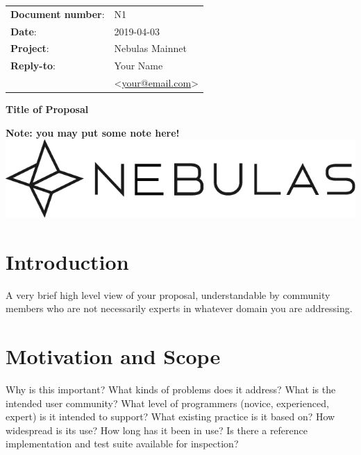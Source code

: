 \documentclass[11pt]{article}
\begin{document}
\begin{titlepage}
    \begin{center}
        \vspace*{1cm}

\begin{flushright}
  \begin{tabular}{ll}
  \textbf{Document number}:& N1 \\
  \textbf{Date}:       & 2019-04-03 \\
  \textbf{Project}:    & Nebulas Mainnet \\
  \textbf{Reply-to}:   & {Your Name}\\
              &
              \textless\href{mailto:your@email.com}{your@email.com}\textgreater
  \end{tabular}
\end{flushright}

\vspace{2cm}
        \Huge
        \textbf{Title of Proposal}

        \vspace{0.5cm}

        \vfill
        \small \textbf{Note: you may put some note here!} \\
        \vspace{0.5cm}
        \includegraphics[scale=0.3]{Nebulas.png}
    \end{center}
\end{titlepage}

\section{Introduction}
A very brief high level view of your proposal, understandable by community members who are not necessarily experts in whatever domain you are addressing.


\section{Motivation and Scope}
Why is this important? What kinds of problems does it address? What is the intended user community? What level of programmers (novice, experienced, expert) is it intended to support? What existing practice is it based on? How widespread is its use? How long has it been in use? Is there a reference implementation and test suite available for inspection?
\end{document}

